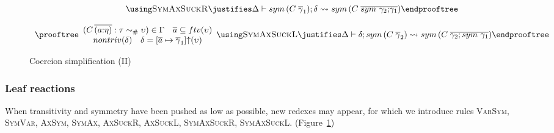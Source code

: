 \documentclass[a4paper,UKenglish]{lipics}
\def\twiddlev{\endprooftree\\ \\ \prooftree}            %
\def\rulename#1{\textsc{#1}}
\def\minusv#1{\using\text{\rulename{#1}}\justifies}     %
\newcommand{\psim}{\mathrel{\sim_{\tiny \#}}}
\def\rulename#1{\textsc{#1}}
\newcommand{\ol}[1]{\overline{#1}}
\newcommand{\sym}[1]{\mathop{sym}\, #1}
\newcommand{\lifting}[2]{[#1]{\uparrow}(#2)}
\newcommand{\rsa}[1]{\rightsquigarrow_{#1}}
\newcommand{\as}{\ol{a}}
\newcommand{\gammas}{\ol{\gamma}}
\begin{document}
\begin{figure}[t]
\[\begin{array}{c}
\begin{array}{c}
  \end{array}
  \minusv{SymAxSuckR} 
    \Delta \vdash \sym{(C\;\gammas_1)} ; \delta \rsa{} \sym{(C\;\ol{\sym{\gamma_2}{;}\gamma_1})}
  \twiddlev 
  \begin{array}{c} 
      (C\,\ol{(a{:}\eta)} : \tau \psim \upsilon) \in \Gamma \quad \as \subseteq ftv(\upsilon) \\
       nontriv(\delta) \quad \delta = \lifting{\as \mapsto\gammas_1}{\upsilon}
  \end{array}
  \minusv{SymAxSuckL}
    \Delta \vdash \delta ; \sym{(C\;\gammas_2)} \rsa{} \sym{(C\;\ol{\gamma_2{;}\sym{\gamma_1}})}
\endprooftree
\end{array}\]\caption{Coercion simplification (II)}\label{fig:optimization2}
\end{figure}

\subsubsection{Leaf reactions}
When transitivity and symmetry have been pushed as low as possible, new redexes may appear, for which we introduce
rules \rulename{VarSym}, \rulename{SymVar}, \rulename{AxSym}, \rulename{SymAx}, \rulename{AxSuckR}, \rulename{AxSuckL}, 
\rulename{SymAxSuckR}, \rulename{SymAxSuckL}. (Figure~\ref{fig:optimization2})
\end{document}

